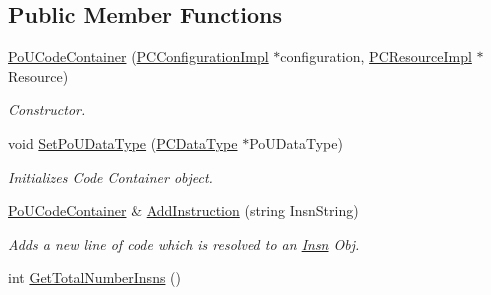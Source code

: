 \subsection*{Public Member Functions}
\begin{DoxyCompactItemize}
\item 
\hyperlink{classpc__emulator_1_1PoUCodeContainer_ad2c9ea317e610e81b96aaee501305c24}{Po\+U\+Code\+Container} (\hyperlink{classpc__emulator_1_1PCConfigurationImpl}{P\+C\+Configuration\+Impl} $\ast$configuration, \hyperlink{classpc__emulator_1_1PCResourceImpl}{P\+C\+Resource\+Impl} $\ast$Resource)\hypertarget{classpc__emulator_1_1PoUCodeContainer_ad2c9ea317e610e81b96aaee501305c24}{}\label{classpc__emulator_1_1PoUCodeContainer_ad2c9ea317e610e81b96aaee501305c24}

\begin{DoxyCompactList}\small\item\em Constructor. \end{DoxyCompactList}\item 
void \hyperlink{classpc__emulator_1_1PoUCodeContainer_a27c04f77508c69dd12308c72be5fd65a}{Set\+Po\+U\+Data\+Type} (\hyperlink{classpc__emulator_1_1PCDataType}{P\+C\+Data\+Type} $\ast$Po\+U\+Data\+Type)\hypertarget{classpc__emulator_1_1PoUCodeContainer_a27c04f77508c69dd12308c72be5fd65a}{}\label{classpc__emulator_1_1PoUCodeContainer_a27c04f77508c69dd12308c72be5fd65a}

\begin{DoxyCompactList}\small\item\em Initializes Code Container object. \end{DoxyCompactList}\item 
\hyperlink{classpc__emulator_1_1PoUCodeContainer}{Po\+U\+Code\+Container} \& \hyperlink{classpc__emulator_1_1PoUCodeContainer_a2f42f66dd588c3e6055311f179bf7b21}{Add\+Instruction} (string Insn\+String)\hypertarget{classpc__emulator_1_1PoUCodeContainer_a2f42f66dd588c3e6055311f179bf7b21}{}\label{classpc__emulator_1_1PoUCodeContainer_a2f42f66dd588c3e6055311f179bf7b21}

\begin{DoxyCompactList}\small\item\em Adds a new line of code which is resolved to an \hyperlink{classpc__emulator_1_1Insn}{Insn} Obj. \end{DoxyCompactList}\item 
int \hyperlink{classpc__emulator_1_1PoUCodeContainer_a125e1efabc8af20f7c21fcff4978cc61}{Get\+Total\+Number\+Insns} ()\hypertarget{classpc__emulator_1_1PoUCodeContainer_a125e1efabc8af20f7c21fcff4978cc61}{}\label{classpc__emulator_1_1PoUCodeContainer_a125e1efabc8af20f7c21fcff4978cc61}


\end{DoxyCompactItemize}
